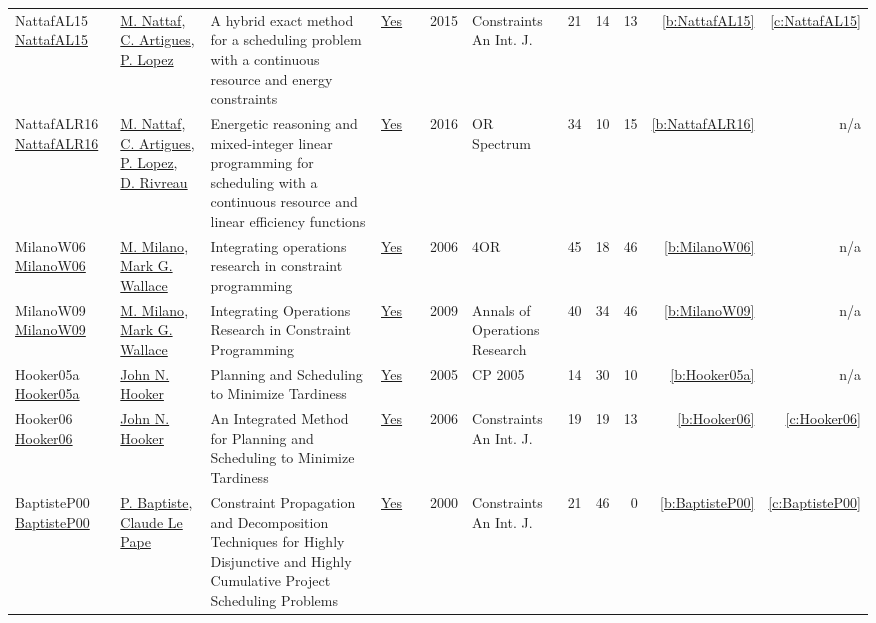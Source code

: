 {\begin{longtable}{>{\raggedright\arraybackslash}p{3cm}>{\raggedright\arraybackslash}p{6cm}>{\raggedright\arraybackslash}p{6.5cm}rrrp{2.5cm}rrrrr}
NattafAL15 \href{https://doi.org/10.1007/s10601-015-9192-z}{NattafAL15} & \hyperref[auth:a81]{M. Nattaf}, \hyperref[auth:a6]{C. Artigues}, \hyperref[auth:a3]{P. Lopez} & A hybrid exact method for a scheduling problem with a continuous resource and energy constraints & \href{../works/NattafAL15.pdf}{Yes} & \cite{NattafAL15} & 2015 & Constraints An Int. J. & 21 & 14 & 13 & \ref{b:NattafAL15} & \ref{c:NattafAL15}\\
NattafALR16 \href{https://doi.org/10.1007/s00291-015-0423-x}{NattafALR16} & \hyperref[auth:a81]{M. Nattaf}, \hyperref[auth:a6]{C. Artigues}, \hyperref[auth:a3]{P. Lopez}, \hyperref[auth:a988]{D. Rivreau} & Energetic reasoning and mixed-integer linear programming for scheduling with a continuous resource and linear efficiency functions & \href{../works/NattafALR16.pdf}{Yes} & \cite{NattafALR16} & 2016 & {OR} Spectrum & 34 & 10 & 15 & \ref{b:NattafALR16} & n/a\\
MilanoW06 \href{http://dx.doi.org/10.1007/s10288-006-0019-z}{MilanoW06} & \hyperref[auth:a144]{M. Milano}, \hyperref[auth:a117]{Mark G. Wallace} & Integrating operations research in constraint programming & \href{../works/MilanoW06.pdf}{Yes} & \cite{MilanoW06} & 2006 & 4OR & 45 & 18 & 46 & \ref{b:MilanoW06} & n/a\\
MilanoW09 \href{http://dx.doi.org/10.1007/s10479-009-0654-9}{MilanoW09} & \hyperref[auth:a144]{M. Milano}, \hyperref[auth:a117]{Mark G. Wallace} & Integrating Operations Research in Constraint Programming & \href{../works/MilanoW09.pdf}{Yes} & \cite{MilanoW09} & 2009 & Annals of Operations Research & 40 & 34 & 46 & \ref{b:MilanoW09} & n/a\\
Hooker05a \href{https://doi.org/10.1007/11564751_25}{Hooker05a} & \hyperref[auth:a161]{John N. Hooker} & Planning and Scheduling to Minimize Tardiness & \href{../works/Hooker05a.pdf}{Yes} & \cite{Hooker05a} & 2005 & CP 2005 & 14 & 30 & 10 & \ref{b:Hooker05a} & n/a\\
Hooker06 \href{https://doi.org/10.1007/s10601-006-8060-2}{Hooker06} & \hyperref[auth:a161]{John N. Hooker} & An Integrated Method for Planning and Scheduling to Minimize Tardiness & \href{../works/Hooker06.pdf}{Yes} & \cite{Hooker06} & 2006 & Constraints An Int. J. & 19 & 19 & 13 & \ref{b:Hooker06} & \ref{c:Hooker06}\\
BaptisteP00 \href{https://doi.org/10.1023/A:1009822502231}{BaptisteP00} & \hyperref[auth:a163]{P. Baptiste}, \hyperref[auth:a164]{Claude Le Pape} & Constraint Propagation and Decomposition Techniques for Highly Disjunctive and Highly Cumulative Project Scheduling Problems & \href{../works/BaptisteP00.pdf}{Yes} & \cite{BaptisteP00} & 2000 & Constraints An Int. J. & 21 & 46 & 0 & \ref{b:BaptisteP00} & \ref{c:BaptisteP00}\\

\end{longtable}}
